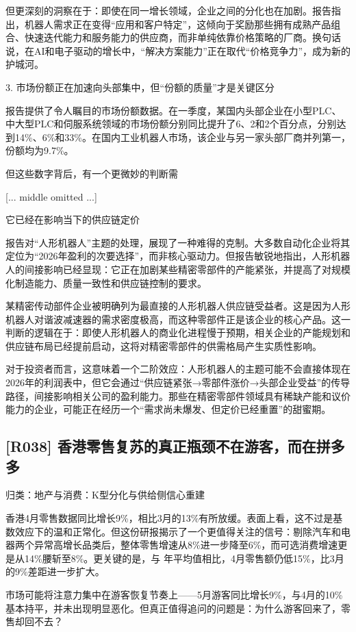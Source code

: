 \documentclass[11pt]{ctexart}
\begin{document}
但更深刻的洞察在于：即使在同一增长领域，企业之间的分化也在加剧。报告指出，机器人需求正在变得“应用和客户特定”，这倾向于奖励那些拥有成熟产品组合、快速迭代能力和服务能力的供应商，而非单纯依靠价格策略的厂商。换句话说，在AI和电子驱动的增长中，“解决方案能力”正在取代“价格竞争力”，成为新的护城河。

3. 市场份额正在加速向头部集中，但“份额的质量”才是关键区分

报告提供了令人瞩目的市场份额数据。在一季度，某国内头部企业在小型PLC、中大型PLC和伺服系统领域的市场份额分别同比提升了6、2和2个百分点，分别达到14\%、6\%和33\%。在国内工业机器人市场，该企业与另一家头部厂商并列第一，份额均为9.7\%。

但这些数字背后，有一个更微妙的判断需

[... middle omitted ...]

它已经在影响当下的供应链定价

报告对“人形机器人”主题的处理，展现了一种难得的克制。大多数自动化企业将其定位为“2026年盈利的次要选择”，而非核心驱动力。但报告敏锐地指出，人形机器人的间接影响已经显现：它正在加剧某些精密零部件的产能紧张，并提高了对规模化制造能力、质量一致性和供应链控制的要求。

某精密传动部件企业被明确列为最直接的人形机器人供应链受益者。这是因为人形机器人对谐波减速器的需求密度极高，而这种零部件正是该企业的核心产品。这一判断的逻辑在于：即使人形机器人的商业化进程慢于预期，相关企业的产能规划和供应链布局已经提前启动，这将对精密零部件的供需格局产生实质性影响。

对于投资者而言，这意味着一个二阶效应：人形机器人的主题可能不会直接体现在2026年的利润表中，但它会通过“供应链紧张→零部件涨价→头部企业受益”的传导路径，间接影响相关公司的盈利能力。那些在精密零部件领域具有稀缺产能和议价能力的企业，可能正在经历一个“需求尚未爆发、但定价已经重置”的甜蜜期。

\subsection{[R038] 香港零售复苏的真正瓶颈不在游客，而在拼多多}
{\small\color{refgray}归类：地产与消费：K型分化与供给侧信心重建}

香港4月零售数据同比增长9\%，相比3月的13\%有所放缓。表面上看，这不过是基数效应下的温和正常化。但这份研报揭示了一个更值得关注的信号：剔除汽车和电器两个异常高增长品类后，整体零售增速从8\%进一步降至6\%，而可选消费增速更是从14\%腰斩至8\%。更关键的是，与 年平均值相比，4月零售额仍低15\%，比3月的9\%差距进一步扩大。

市场可能将注意力集中在游客恢复节奏上——5月游客同比增长9\%，与4月的10\%基本持平，并未出现明显恶化。但真正值得追问的问题是：为什么游客回来了，零售却回不去？
\end{document}
